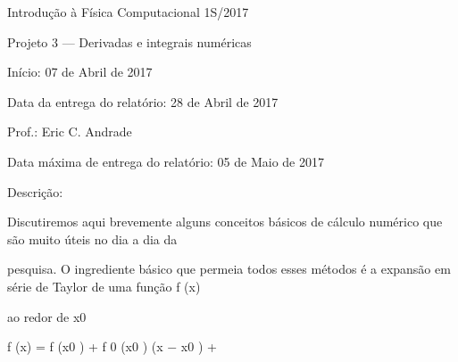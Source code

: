 \documentclass[a4paper,portrait,12pt]{article}
\begin{document}
\begin{flushleft}
Introdu\c{c}\~{a}o \`{a} F\'{i}sica Computacional 1S/2017
\end{flushleft}


\begin{flushleft}
Projeto 3 --- Derivadas e integrais num\'{e}ricas
\end{flushleft}


\begin{flushleft}
In\'{i}cio: 07 de Abril de 2017
\end{flushleft}


\begin{flushleft}
Data da entrega do relat\'{o}rio: 28 de Abril de 2017
\end{flushleft}





\begin{flushleft}
Prof.: Eric C. Andrade
\end{flushleft}





\begin{flushleft}
Data m\'{a}xima de entrega do relat\'{o}rio: 05 de Maio de 2017
\end{flushleft}





\begin{flushleft}
Descri\c{c}\~{a}o:
\end{flushleft}


\begin{flushleft}
Discutiremos aqui brevemente alguns conceitos b\'{a}sicos de c\'{a}lculo num\'{e}rico que s\~{a}o muito \'{u}teis no dia a dia da
\end{flushleft}


\begin{flushleft}
pesquisa. O ingrediente b\'{a}sico que permeia todos esses m\'{e}todos \'{e} a expans\~{a}o em s\'{e}rie de Taylor de uma fun\c{c}\~{a}o f (x)
\end{flushleft}


\begin{flushleft}
ao redor de x0
\end{flushleft}


\begin{flushleft}
f (x) = f (x0 ) + f 0 (x0 ) (x $-$ x0 ) +
\end{flushleft}
\end{document}
